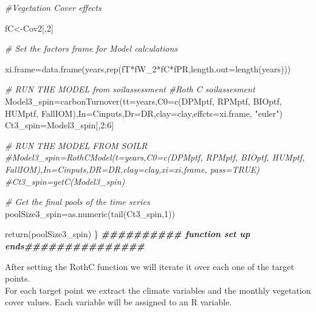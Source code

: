 \documentclass[
  10pt,
  b5paper,
]{book}
\newenvironment{Shaded}{\begin{snugshade}}{\end{snugshade}}
\newcommand{\AttributeTok}[1]{\textcolor[rgb]{0.77,0.63,0.00}{#1}}
\newcommand{\CommentTok}[1]{\textcolor[rgb]{0.56,0.35,0.01}{\textit{#1}}}
\newcommand{\DecValTok}[1]{\textcolor[rgb]{0.00,0.00,0.81}{#1}}
\newcommand{\DocumentationTok}[1]{\textcolor[rgb]{0.56,0.35,0.01}{\textbf{\textit{#1}}}}
\newcommand{\FunctionTok}[1]{\textcolor[rgb]{0.00,0.00,0.00}{#1}}
\newcommand{\NormalTok}[1]{#1}
\newcommand{\OtherTok}[1]{\textcolor[rgb]{0.56,0.35,0.01}{#1}}
\newcommand{\SpecialCharTok}[1]{\textcolor[rgb]{0.00,0.00,0.00}{#1}}
\newcommand{\StringTok}[1]{\textcolor[rgb]{0.31,0.60,0.02}{#1}}
\begin{document}
\begin{Shaded}
\begin{Highlighting}[]
\CommentTok{\#Vegetation Cover effects }

\NormalTok{fC}\OtherTok{\textless{}{-}}\NormalTok{Cov2[,}\DecValTok{2}\NormalTok{]}

\CommentTok{\# Set the factors frame for Model calculations}

\NormalTok{xi.frame}\OtherTok{=}\FunctionTok{data.frame}\NormalTok{(years,}\FunctionTok{rep}\NormalTok{(fT}\SpecialCharTok{*}\NormalTok{fW\_2}\SpecialCharTok{*}\NormalTok{fC}\SpecialCharTok{*}\NormalTok{fPR,}\AttributeTok{length.out=}\FunctionTok{length}\NormalTok{(years)))}

\CommentTok{\# RUN THE MODEL from soilassessment}
\CommentTok{\#Roth C soilassesment}
\NormalTok{Model3\_spin}\OtherTok{=}\FunctionTok{carbonTurnover}\NormalTok{(}\AttributeTok{tt=}\NormalTok{years,}\AttributeTok{C0=}\FunctionTok{c}\NormalTok{(DPMptf, RPMptf, BIOptf, HUMptf, FallIOM),}\AttributeTok{In=}\NormalTok{Cinputs,}\AttributeTok{Dr=}\NormalTok{DR,}\AttributeTok{clay=}\NormalTok{clay,}\AttributeTok{effcts=}\NormalTok{xi.frame, }\StringTok{"euler"}\NormalTok{) }
\NormalTok{Ct3\_spin}\OtherTok{=}\NormalTok{Model3\_spin[,}\DecValTok{2}\SpecialCharTok{:}\DecValTok{6}\NormalTok{]}

\CommentTok{\# RUN THE MODEL FROM SOILR}
\CommentTok{\#Model3\_spin=RothCModel(t=years,C0=c(DPMptf, RPMptf, BIOptf, HUMptf, FallIOM),In=Cinputs,DR=DR,clay=clay,xi=xi.frame, pass=TRUE) }
\CommentTok{\#Ct3\_spin=getC(Model3\_spin)}

\CommentTok{\# Get the final pools of the time series}
\NormalTok{poolSize3\_spin}\OtherTok{=}\FunctionTok{as.numeric}\NormalTok{(}\FunctionTok{tail}\NormalTok{(Ct3\_spin,}\DecValTok{1}\NormalTok{))}

\FunctionTok{return}\NormalTok{(poolSize3\_spin)}
\NormalTok{\}}
\DocumentationTok{\#\#\#\#\#\#\#\#\#\# function set up ends\#\#\#\#\#\#\#\#\#\#\#\#\#\#\#}
\end{Highlighting}
\end{Shaded}

After setting the RothC function we will iterate it over each one of the target points.\\
For each target point we extract the climate variables and the monthly vegetation cover values. Each variable will be assigned to an R variable.
\end{document}
